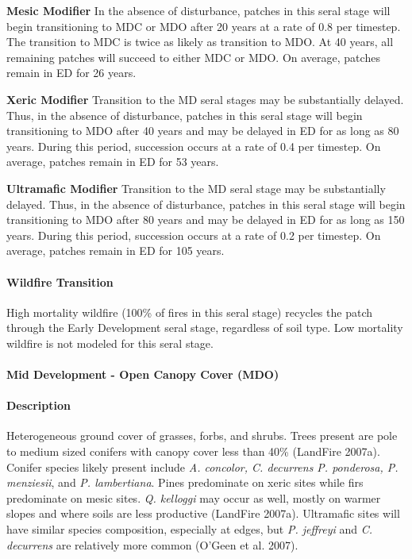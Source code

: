 \begin{adjustwidth}{2cm}{}
\textbf{Mesic Modifier } In the absence of disturbance, patches in this seral stage will begin transitioning to MDC or MDO after 20 years at a rate of 0.8 per timestep. The transition to MDC is twice as likely as transition to MDO.  At 40 years, all remaining patches will succeed to either MDC or MDO. On average, patches remain in ED for 26 years.

\medskip
\noindent \textbf{Xeric Modifier}  Transition to the MD seral stages may be substantially delayed. Thus, in the absence of disturbance, patches in this seral stage will begin transitioning to MDO after 40 years and may be delayed in ED for as long as 80 years. During this period, succession occurs at a rate of 0.4 per timestep. On average, patches remain in ED for 53 years.

\medskip
\noindent \textbf{Ultramafic Modifier}  Transition to the MD seral stage may be substantially delayed. Thus, in the absence of disturbance, patches in this seral stage will begin transitioning to MDO after 80 years and may be delayed in ED for as long as 150 years. During this period, succession occurs at a rate of 0.2 per timestep. On average, patches remain in ED for 105 years.

\end{adjustwidth}



\paragraph{Wildfire Transition} High mortality wildfire (100\% of fires in this seral stage) recycles the patch through the Early Development seral stage, regardless of soil type. Low mortality wildfire is not modeled for this seral stage. 

\noindent\hrulefill


\paragraph{Mid Development - Open Canopy Cover (MDO)} 

\paragraph{Description} Heterogeneous ground cover of grasses, forbs, and shrubs. Trees present are pole to medium sized conifers with canopy cover less than 40\% (LandFire 2007a). Conifer species likely present include \emph{A. concolor, C. decurrens P. ponderosa, P. menziesii}, and \emph{P. lambertiana}. Pines predominate on xeric sites while firs predominate on mesic sites. \emph{Q. kelloggi} may occur as well, mostly on warmer slopes and where soils are less productive (LandFire 2007a). Ultramafic sites will have similar species composition, especially at edges, but \emph{P. jeffreyi} and \emph{C. decurrens} are relatively more common (O'Geen et al. 2007).

